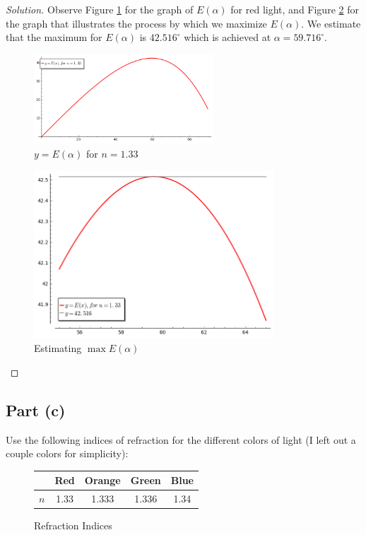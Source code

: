 \documentclass[letterpaper, 12pt]{amsart}
\theoremstyle{definition}  %
\begin{document}
		\begin{proof}[Solution]
		Observe Figure \ref{redGraph} for the graph of $E(\alpha)$ for red light, and Figure \ref{redMax} for the graph that illustrates the process by which we maximize $E(\alpha)$.
		We estimate that the maximum for $E(\alpha)$ is $42.516^{\circ}$ which is achieved at $\alpha = 59.716^{\circ}$.
			\begin{figure}[h]
				\includegraphics[width=0.6\textwidth]{figs/c.png}
				\caption{$y = E(\alpha)$ for $n = 1.33$}
				\label{redGraph}
			\end{figure}

			\begin{figure}[h]
				\includegraphics[width=0.8\textwidth]{figs/d.png}
				\caption{Estimating $\max E(\alpha)$}
				\label{redMax}
			\end{figure}
		\end{proof}
		\pagebreak

		\subsection*{Part (c)}
		Use the following indices of refraction for the different colors of light (I left out a couple colors for simplicity):

		\begin{figure}[h]
			\begin{tabular}{c|c|c|c|c}
			& Red & Orange & Green & Blue \\
			\hline
			$n$ & 1.33 & 1.333 & 1.336 & 1.34
			\end{tabular}
			\caption{Refraction Indices}
			\label{refractionIndices}
		\end{figure}
		
\end{document}
